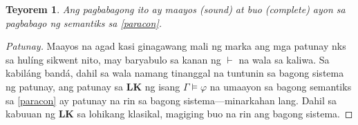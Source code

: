 \documentclass{article}
\newtheorem{theorem}{Teyorem}[section]
\begin{document}
\begin{theorem}
Ang pagbabagong ito ay maayos (sound) at buo (complete) ayon sa pagbabago ng semantiks sa \ref{paracon}.
\end{theorem}
\begin{proof}[Patunay]
Maayos na agad kasi ginagawang mali ng marka ang mga patunay nks sa hulíng sikwent nito, may baryabulo sa kanan ng $\vdash$ na wala sa kaliwa. Sa kabiláng bandá, dahil sa wala namang tinanggal na tuntunin sa bagong sistema ng patunay, ang patunay sa \textbf{LK} ng isang $\Gamma\models\varphi$ na umaayon sa bagong semantiks sa \ref{paracon} ay patunay na rin sa bagong sistema---minarkahan lang. Dahil sa kabuuan ng \textbf{LK} sa lohikang klasikal, magiging buo na rin ang bagong sistema.
\end{proof}



\end{document}
